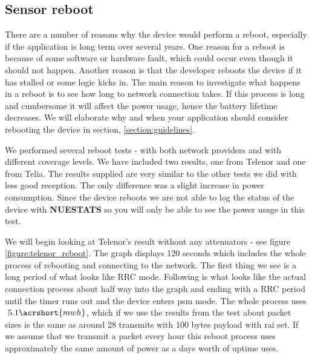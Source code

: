 \documentclass[USenglish]{ifimaster}  %
\begin{document}
\subsection{Sensor reboot} \label{ssection:reboottest}
There are a number of reasons why the device would perform a reboot, especially if the application is long term over several years. One reason for a reboot is because of some software or hardware fault, which could occur even though it should not happen. Another reason is that the developer reboots the device if it has stalled or some logic kicks in. The main reason to investigate what happens in a reboot is to see how long to network connection takes. If this process is long and cumbersome it will affect the power usage, hence the battery lifetime decreases. We will elaborate why and when your application should consider rebooting the device in section, \vref{section:guidelines}.

We performed several reboot tests - with both network providers and with different coverage levels. We have included two results, one from Telenor and one from Telia. The results supplied are very similar to the other tests we did with less good reception. The only difference was a slight increase in power consumption.
Since the device reboots we are not able to log the status of the device with \textbf{NUESTATS} so you will only be able to see the power usage in this test.

We will begin looking at Telenor's result without any attenuators - see figure \vref{figure:telenor_reboot}. The graph displays 120 seconds which includes the whole process of rebooting and connecting to the network. The first thing we see is a long period of what looks like RRC mode. Following is what looks like the actual connection process about half way into the graph and ending with a RRC period until the timer runs out and the device enters \acrshort{psm} mode. The whole process uses ${~5.1 \acrshort{mwh}}$, which if we use the results from the test about packet sizes is the same as around 28 transmits with 100 bytes payload with \acrshort{rai} set. If we assume that we transmit a packet every hour this reboot process uses approximately the same amount of power as a days worth of uptime uses.
\end{document}
